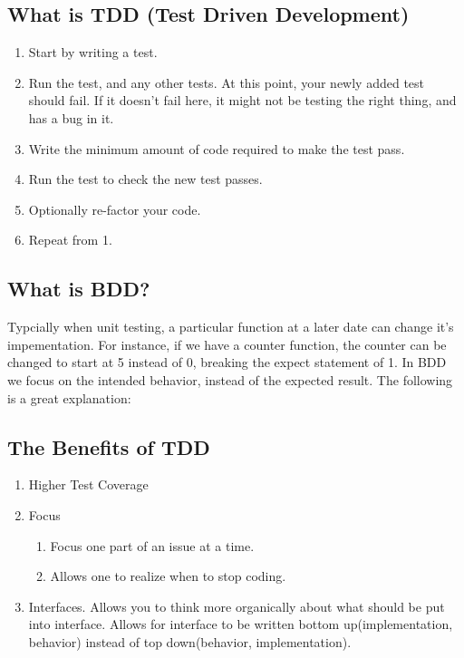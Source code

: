 \subsection{What is TDD (Test Driven Development)}
\begin{enumerate}
  \item Start by writing a test.
  \item Run the test, and any other tests. At this point, your newly added test
  should fail. If it doesn't fail here, it might not be testing the right thing,
  and has a bug in it.
  \item Write the minimum amount of code required to make the test pass.
  \item Run the test to check the new test passes.
  \item Optionally re-factor your code.
  \item Repeat from 1.
\end{enumerate}

\subsection{ What is BDD? }
Typcially when unit testing, a particular function at a later date can change
it's impementation. For instance, if we have a counter function, the counter
can be changed to start at 5 instead of 0, breaking the expect statement of 1.
In BDD we focus on the intended behavior, instead of the expected result. The
following is a great explanation:

\subsection{ The Benefits of TDD }
\begin{enumerate}
  \item Higher Test Coverage
  \item Focus
    \begin{enumerate}
      \item Focus one part of an issue at a time.
      \item Allows one to realize when to stop coding.
    \end{enumerate}
  \item Interfaces. Allows you to think more organically about what should be
  put into interface. Allows for interface to be written bottom
  up(implementation, behavior) instead of top down(behavior, implementation).
\end{enumerate}

